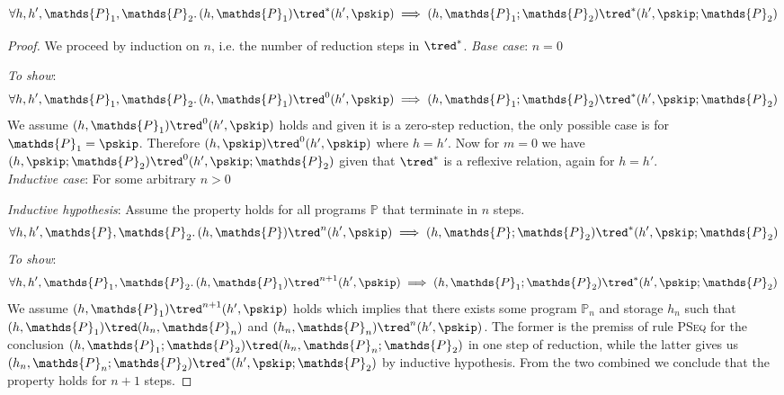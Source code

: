 \begin{lem}
	\label{ref:aseq}
	\[
		\forall h, h', \mathds{P}_1, \mathds{P}_2 \ldotp
		(h, \mathds{P}_1) \tred^* (h', \pskip) \implies 
		(h, \mathds{P}_1; \mathds{P}_2) \tred^* (h', \pskip; \mathds{P}_2)
	\]
	
	{\parindent0pt
	\begin{proof}
	We proceed by induction on $n$, i.e. the number of reduction steps in $\tred^*$.
	\indline
	\textit{Base case}: $n = 0$
	
	\textit{To show}: 
	\[
		\forall h, h', \mathds{P}_1, \mathds{P}_2 \ldotp
		(h, \mathds{P}_1) \tred^0 (h', \pskip) \implies 
		(h, \mathds{P}_1; \mathds{P}_2) \tred^* (h', \pskip; \mathds{P}_2)
	\]
	We assume $(h, \mathds{P}_1) \tred^0 (h', \pskip)$ holds and given it is a zero-step reduction, the only possible case is for $\mathds{P}_1 = \pskip$. Therefore $(h, \pskip) \tred^0 (h', \pskip)$ where $h = h'$. Now for $m = 0$ we have $(h, \pskip; \mathds{P}_2) \tred^0 (h', \pskip; \mathds{P}_2)$ given that $\tred^*$ is a reflexive relation, again for $h = h'$. \\
	\indline
	\textit{Inductive case}: For some arbitrary $n > 0$
	
	\textit{Inductive hypothesis}: Assume the property holds for all programs $\mathds{P}$ that terminate in $n$ steps.
	\[
		\forall h, h', \mathds{P}, \mathds{P}_2 \ldotp
		(h, \mathds{P}) \tred^n (h', \pskip) \implies 
		(h, \mathds{P}; \mathds{P}_2) \tred^* (h', \pskip; \mathds{P}_2)
	\]
	\textit{To show}:
	\[
		\forall h, h', \mathds{P}_1, \mathds{P}_2 \ldotp
		(h, \mathds{P}_1) \tred^{n+1} (h', \pskip) \implies 
		(h, \mathds{P}_1; \mathds{P}_2) \tred^* (h', \pskip; \mathds{P}_2)
	\]
	We assume $(h, \mathds{P}_1) \tred^{n+1} (h', \pskip)$ holds which implies that there exists some program $\mathds{P}_n$ and storage $h_n$ such that $(h, \mathds{P}_1) \tred (h_n, \mathds{P}_n)$ and $(h_n, \mathds{P}_n) \tred^n (h', \pskip)$. The former is the premiss of rule \textsc{PSeq} for the conclusion $(h, \mathds{P}_1; \mathds{P}_2) \tred (h_n, \mathds{P}_n; \mathds{P}_2)$ in one step of reduction, while the latter gives us $(h_n, \mathds{P}_n; \mathds{P}_2) \tred^* (h', \pskip ; \mathds{P}_2)$ by inductive hypothesis. From the two combined we conclude that the property holds for $n + 1$ steps.
	\end{proof}
	}
\end{lem}

